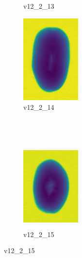 \documentclass[11pt]{article}
\begin{document}
\begin{figure}
\begin{subfigure}[b]{0.15\textwidth}
        \caption{v12\_2\_13}
         \label{fig:five over x}
     \end{subfigure}
     \hfill
    \begin{subfigure}[b]{0.15\textwidth}
         \centering
         \includegraphics[width=3cm, height=4.5cm]{images/kartofler/v12_2_14_cut.png}
        \caption{v12\_2\_14}
         \label{fig:five over x}
     \end{subfigure}
     
     
     \\ \\
     
     
    \begin{subfigure}[b]{0.15\textwidth}
         \centering
         \includegraphics[width=3cm, height=4.5cm]{images/kartofler/v12_2_15_cut.png}
         \caption{v12\_2\_15}
         \label{fig:y equals x}
     \end{subfigure}
\end{figure}





\newpage
\end{document}
